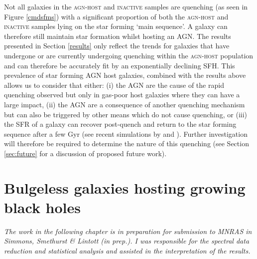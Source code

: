 Not all galaxies in the \textsc{agn-host} and \textsc{inactive} samples are quenching (as seen in Figure \ref{cmdsfms}) with a significant proportion of both the \textsc{agn-host} and \textsc{inactive} samples lying on the star forming `main sequence'. A galaxy can therefore still maintain star formation whilst hosting an AGN. The results presented in Section \ref{results} only reflect the trends for galaxies that have undergone or are currently undergoing quenching within the \textsc{agn-host} population and can therefore be accurately fit by an exponentially declining SFH. This prevalence of star forming AGN host galaxies, combined with the results above allows us to consider that either: (i)  the AGN are the cause of the rapid quenching observed but only in gas-poor host galaxies where they can have a large impact, (ii) the AGN are a consequence of another quenching mechanism but can also be triggered by other means which do not cause quenching, or (iii) the SFR of a galaxy can recover post-quench and return to the star forming sequence after a few Gyr (see recent simulations by \citealt{pontzen16} and \citealt{sparre16}). Further investigation will therefore be required to determine the nature of this quenching (see Section \ref{sec:future} for a discussion of proposed future work).


 

\newpage

\section{Bulgeless galaxies hosting growing black holes}\label{sec:intbulgeless}

\emph{The work in the following chapter is in preparation for submission to MNRAS in Simmons, Smethurst \& Lintott (in prep.). I was responsible for the spectral data reduction and statistical analysis and assisted in the interpretation of the results.}

